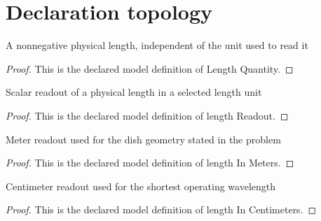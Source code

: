 \section{Declaration topology}
\begin{definition}
  \label{def:physics:phyx-mini-0132:phyxminiproblems-problemphyxmini0132-lengthquantity}
  A nonnegative physical length, independent of the unit used to read it
\end{definition}
\begin{proof}
  This is the declared model definition of Length Quantity.
\end{proof}
\begin{definition}
  \label{def:physics:phyx-mini-0132:phyxminiproblems-problemphyxmini0132-lengthreadout}
  Scalar readout of a physical length in a selected length unit
\end{definition}
\begin{proof}
  This is the declared model definition of length Readout.
\end{proof}
\begin{definition}
  \label{def:physics:phyx-mini-0132:phyxminiproblems-problemphyxmini0132-lengthinmeters}
  Meter readout used for the dish geometry stated in the problem
\end{definition}
\begin{proof}
  This is the declared model definition of length In Meters.
\end{proof}
\begin{definition}
  \label{def:physics:phyx-mini-0132:phyxminiproblems-problemphyxmini0132-lengthincentimeters}
  Centimeter readout used for the shortest operating wavelength
\end{definition}
\begin{proof}
  This is the declared model definition of length In Centimeters.
\end{proof}
